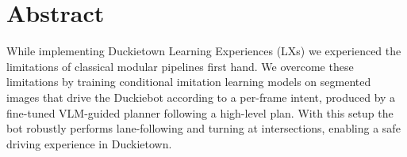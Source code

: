 \chapter*{Abstract}
\label{chapter:abstract}

While implementing Duckietown Learning Experiences (LXs) we experienced the limitations of classical modular pipelines first hand. 
We overcome these limitations by training conditional imitation learning models on segmented images that drive the Duckiebot according to a per-frame intent, produced by a fine-tuned VLM-guided planner following a high-level plan. 
With this setup the bot robustly performs lane-following and turning at intersections, enabling a safe driving experience in Duckietown.